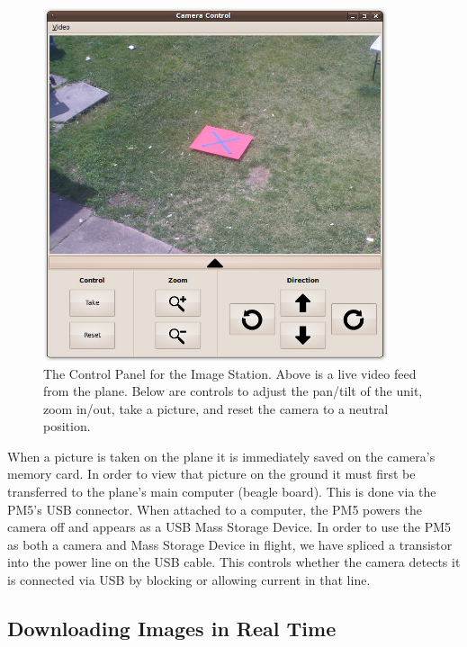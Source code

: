 \documentclass[pdftex,10pt,letter]{article}
\begin{document}
\begin{figure} [H]
  \centering
  	\includegraphics[width=0.9\textwidth]{../images/ImageStationControls.jpg}
  	\caption[Image Station Control Panel]{The Control Panel for the Image Station.  Above is a live video feed from the plane.  Below are controls to adjust the pan/tilt of the unit, zoom in/out, take a picture, and reset the camera to a neutral position.}
  	\label{fig:imagestationcontrols}
\end{figure}

When a picture is taken on the plane it is immediately saved on the camera's memory card.  In order to view that picture on the ground it must first be transferred to the plane's main computer (beagle board).  This is done via the PM5's USB connector.  When attached to a computer, the PM5 powers the camera off and appears as a USB Mass Storage Device. In order to use the PM5 as both a camera and Mass Storage Device in flight, we have spliced a transistor into the power line on the USB cable. This controls whether the camera detects it is connected via USB by blocking or allowing current in that line.

\subsection{Downloading Images in Real Time}
\end{document}
